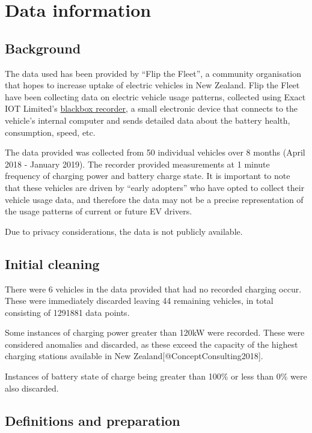 \documentclass[]{article}
\begin{document}
\section{Data information}\label{data}

\subsection{Background}\label{background}

The data used has been provided by ``Flip the Fleet'', a community
organisation that hopes to increase uptake of electric vehicles in New
Zealand. Flip the Fleet have been collecting data on electric vehicle
usage patterns, collected using Exact IOT Limited's
\href{https://flipthefleet.org/ev-black-box/}{blackbox recorder}, a
small electronic device that connects to the vehicle's internal computer
and sends detailed data about the battery health, consumption, speed,
etc.

The data provided was collected from 50 individual vehicles over 8
months (April 2018 - January 2019). The recorder provided measurements
at 1 minute frequency of charging power and battery charge state. It is
important to note that these vehicles are driven by ``early adopters''
who have opted to collect their vehicle usage data, and therefore the
data may not be a precise representation of the usage patterns of
current or future EV drivers.

Due to privacy considerations, the data is not publicly available.

\subsection{Initial cleaning}\label{initial-cleaning}

There were 6 vehicles in the data provided that had no recorded charging
occur. These were immediately discarded leaving 44 remaining vehicles,
in total consisting of 1291881 data points.

Some instances of charging power greater than 120kW were recorded. These
were considered anomalies and discarded, as these exceed the capacity of
the highest charging stations available in New
Zealand{[}@ConceptConsulting2018{]}.

Instances of battery state of charge being greater than 100\% or less
than 0\% were also discarded.

\subsection{Definitions and preparation}\label{cleaning}
\end{document}

